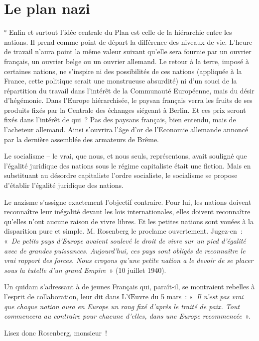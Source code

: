 \documentclass[french,twoside]{book} %
\begin{document}
\section[{Le plan nazi}]{Le plan nazi}
° Enfin et surtout l’idée centrale du Plan est celle de la hiérarchie entre les nations. Il prend comme point de départ la différence des niveaux de vie. L’heure de travail n’aura point la même valeur suivant qu’elle sera fournie par un ouvrier français, un ouvrier belge ou un ouvrier allemand. Le retour à la terre, imposé à certaines nations, ne s’inspire ni des possibilités de ces nations (appliquée à la France, cette politique serait une monstrueuse absurdité) ni d’un souci de la répartition du travail dans l’intérêt de la Communauté Européenne, mais du désir d’hégémonie. Dans l’Europe hiérarchisée, le paysan français verra les fruits de ses produits fixés par la Centrale des échanges siégeant à Berlin. Et ces prix seront fixés dans l’intérêt de qui ? Pas des paysans français, bien entendu, mais de l’acheteur allemand. Ainsi s’ouvrira l’âge d’or de l’Economie allemande annoncé par la dernière assemblée des armateurs de Brême.\par
Le socialisme – le vrai, que nous, et nous seuls, représentons, avait souligné que l’égalité juridique des nations sous le régime capitaliste était une fiction. Mais en substituant au désordre capitaliste l’ordre socialiste, le socialisme se propose d’établir l’égalité juridique des nations.\par
Le nazisme s’assigne exactement l’objectif contraire. Pour lui, les nations doivent reconnaître leur inégalité devant les lois internationales, elles doivent reconnaître qu’elles n’ont aucune raison de vivre libres. Et les petites nations sont vouées à la disparition pure et simple. M. Rosenberg le proclame ouvertement. Jugez-en : « \emph{De petits pays d’Europe avaient soulevé le droit de vivre sur un pied d’égalité avec de grandes puissances. Aujourd’hui, ces pays sont obligés de reconnaître le vrai rapport des forces. Nous croyons qu’une petite nation a le devoir de se placer sous la tutelle d’un grand Empire} » (10 juillet 1940).\par
Un quidam s’adressant à de jeunes Français qui, paraît-il, se montraient rebelles à l’esprit de collaboration, leur dit dans L’Œuvre du 5 mars : « \emph{Il n’est pas vrai que chaque nation aura en Europe un rang fixé d’après le traité de paix. Tout commencera au contraire pour chacune d’elles, dans une Europe recommencée} ».\par
Lisez donc Rosenberg, monsieur !
\end{document}
